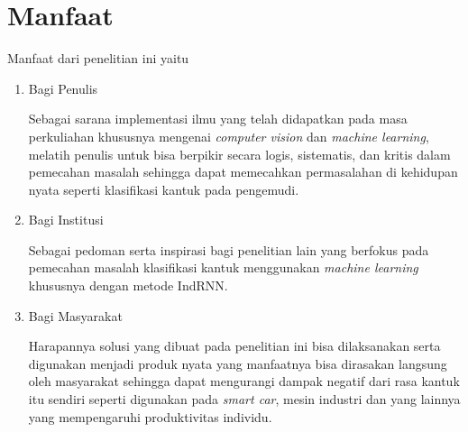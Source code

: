 \section{Manfaat}

Manfaat dari penelitian ini yaitu
\begin{enumerate}[nolistsep]
      \item Bagi Penulis

            Sebagai sarana implementasi ilmu yang telah didapatkan pada masa
            perkuliahan khususnya mengenai \emph{computer vision} dan \emph{machine learning}, melatih penulis untuk bisa
            berpikir secara logis, sistematis, dan kritis dalam pemecahan masalah sehingga dapat
            memecahkan permasalahan di kehidupan nyata seperti klasifikasi kantuk pada pengemudi.

      \item Bagi Institusi

            Sebagai pedoman serta inspirasi bagi penelitian lain yang
            berfokus pada pemecahan masalah klasifikasi kantuk menggunakan \emph{machine learning} khususnya dengan
            metode IndRNN.

      \item Bagi Masyarakat

            Harapannya solusi yang dibuat pada penelitian ini bisa dilaksanakan serta digunakan
            menjadi produk nyata yang manfaatnya bisa dirasakan langsung oleh masyarakat sehingga dapat
            mengurangi dampak negatif dari rasa kantuk itu sendiri seperti digunakan pada \emph{smart car},
            mesin industri dan yang lainnya yang mempengaruhi produktivitas individu.
\end{enumerate}